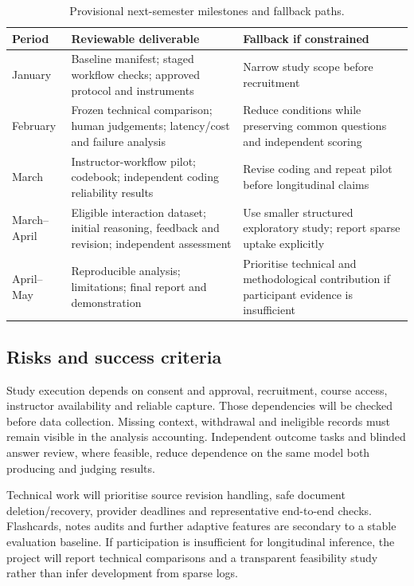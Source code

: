 \documentclass[11pt,a4paper]{article}
\begin{document}
\begin{table}[htbp]
\centering\small
\caption{Provisional next-semester milestones and fallback paths.}
\begin{tabularx}{\textwidth}{@{}P{0.16\textwidth}YY@{}}
\toprule
Period & Reviewable deliverable & Fallback if constrained\\
\midrule
January & Baseline manifest; staged workflow checks; approved protocol and instruments & Narrow study scope before recruitment\\
February & Frozen technical comparison; human judgements; latency/cost and failure analysis & Reduce conditions while preserving common questions and independent scoring\\
March & Instructor-workflow pilot; codebook; independent coding reliability results & Revise coding and repeat pilot before longitudinal claims\\
March--April & Eligible interaction dataset; initial reasoning, feedback and revision; independent assessment & Use smaller structured exploratory study; report sparse uptake explicitly\\
April--May & Reproducible analysis; limitations; final report and demonstration & Prioritise technical and methodological contribution if participant evidence is insufficient\\
\bottomrule
\end{tabularx}
\end{table}

\subsection{Risks and success criteria}
Study execution depends on consent and approval, recruitment, course access, instructor availability and reliable capture. Those dependencies will be checked before data collection. Missing context, withdrawal and ineligible records must remain visible in the analysis accounting. Independent outcome tasks and blinded answer review, where feasible, reduce dependence on the same model both producing and judging results.

Technical work will prioritise source revision handling, safe document deletion/recovery, provider deadlines and representative end-to-end checks. Flashcards, notes audits and further adaptive features are secondary to a stable evaluation baseline. If participation is insufficient for longitudinal inference, the project will report technical comparisons and a transparent feasibility study rather than infer development from sparse logs.
\end{document}
